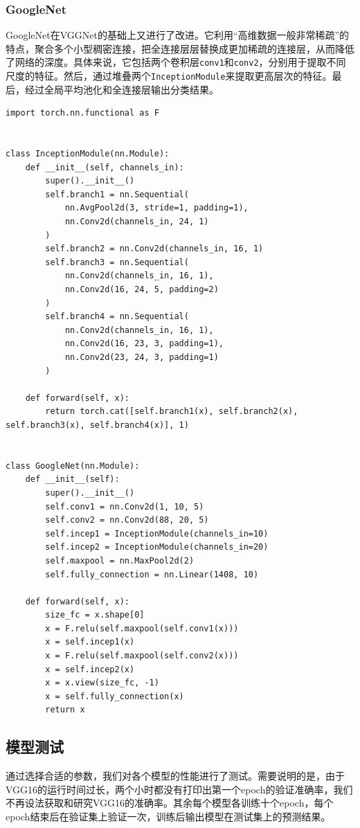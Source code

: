 \documentclass{article}
\begin{document}
\subsubsection{GoogleNet}
GoogleNet在VGGNet的基础上又进行了改进。它利用“高维数据一般非常稀疏”的特点，聚合多个⼩型稠密连接，把全连接层层替换成更加稀疏的连接层，从而降低了网络的深度。具体来说，它包括两个卷积层\lstinline|conv1|和\lstinline|conv2|，分别用于提取不同尺度的特征。然后，通过堆叠两个\lstinline|InceptionModule|来提取更高层次的特征。最后，经过全局平均池化和全连接层输出分类结果。
\begin{lstlisting}
import torch.nn.functional as F


class InceptionModule(nn.Module):
    def __init__(self, channels_in):
        super().__init__()
        self.branch1 = nn.Sequential(
            nn.AvgPool2d(3, stride=1, padding=1),
            nn.Conv2d(channels_in, 24, 1)
        )
        self.branch2 = nn.Conv2d(channels_in, 16, 1)
        self.branch3 = nn.Sequential(
            nn.Conv2d(channels_in, 16, 1),
            nn.Conv2d(16, 24, 5, padding=2)
        )
        self.branch4 = nn.Sequential(
            nn.Conv2d(channels_in, 16, 1),
            nn.Conv2d(16, 23, 3, padding=1),
            nn.Conv2d(23, 24, 3, padding=1)
        )

    def forward(self, x):
        return torch.cat([self.branch1(x), self.branch2(x), self.branch3(x), self.branch4(x)], 1)


class GoogleNet(nn.Module):
    def __init__(self):
        super().__init__()
        self.conv1 = nn.Conv2d(1, 10, 5)
        self.conv2 = nn.Conv2d(88, 20, 5)
        self.incep1 = InceptionModule(channels_in=10)
        self.incep2 = InceptionModule(channels_in=20)
        self.maxpool = nn.MaxPool2d(2)
        self.fully_connection = nn.Linear(1408, 10)

    def forward(self, x):
        size_fc = x.shape[0]
        x = F.relu(self.maxpool(self.conv1(x)))
        x = self.incep1(x)
        x = F.relu(self.maxpool(self.conv2(x)))
        x = self.incep2(x)
        x = x.view(size_fc, -1)
        x = self.fully_connection(x)
        return x
\end{lstlisting}

\subsection{模型测试}
通过选择合适的参数，我们对各个模型的性能进行了测试。需要说明的是，由于VGG16的运行时间过长，两个小时都没有打印出第一个epoch的验证准确率，我们不再设法获取和研究VGG16的准确率。其余每个模型各训练十个epoch，每个epoch结束后在验证集上验证一次，训练后输出模型在测试集上的预测结果。
\end{document}
